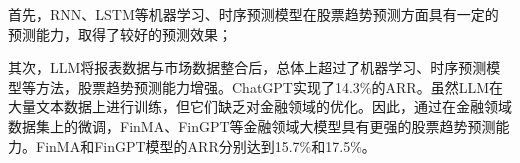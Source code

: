 
首先，RNN、LSTM等机器学习、时序预测模型在股票趋势预测方面具有一定的预测能力，取得了较好的预测效果；

其次，LLM将报表数据与市场数据整合后，总体上超过了机器学习、时序预测模型等方法，股票趋势预测能力增强。ChatGPT实现了14.3\%的ARR。虽然LLM在大量文本数据上进行训练，但它们缺乏对金融领域的优化。因此，通过在金融领域数据集上的微调，FinMA、FinGPT等金融领域大模型具有更强的股票趋势预测能力。FinMA和FinGPT模型的ARR分别达到15.7\%和17.5\%。

